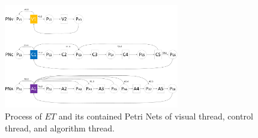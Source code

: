 \documentclass[journal,UTF8]{IEEEtran}
\begin{document}
%
%

\begin{figure}
	\centering
	\includegraphics[width=3in]{fig/ThreadExecution.pdf}
	\caption{ Process of $ET$ and its contained Petri Nets of visual thread, control thread, and algorithm thread.}
	\label{fig:threadExecution}
\end{figure}
\end{document}
